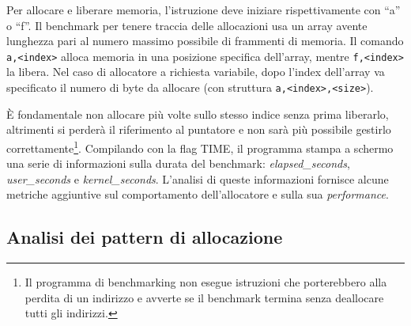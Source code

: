 Per allocare e liberare memoria, l’istruzione deve iniziare rispettivamente con ``a'' o ``f''. Il benchmark per tenere traccia delle allocazioni usa un array avente lunghezza pari al numero massimo possibile di frammenti di memoria. Il comando \texttt{a,<index>} alloca memoria in una posizione specifica dell'array, mentre \texttt{f,<index>} la libera. Nel caso di allocatore a richiesta variabile, dopo l’index dell’array va specificato il numero di byte da allocare (con struttura \texttt{a,<index>,<size>}). 

È fondamentale non allocare più volte sullo stesso indice senza prima liberarlo, altrimenti si perderà il riferimento al puntatore e non sarà più possibile gestirlo correttamente\footnote{Il programma di benchmarking non esegue istruzioni che porterebbero alla perdita di un indirizzo e avverte se il benchmark termina senza deallocare tutti gli indirizzi.}. Compilando con la flag TIME, il programma stampa a schermo una serie di informazioni sulla durata del benchmark: \textit{elapsed\_seconds}, \textit{user\_seconds} e \textit{kernel\_seconds}. L'analisi di queste informazioni fornisce alcune metriche aggiuntive sul comportamento dell'allocatore e sulla sua \textit{performance}.

\subsection{Analisi dei pattern di allocazione}

